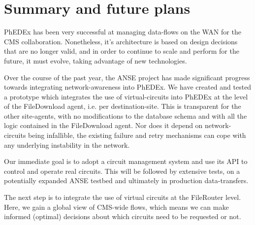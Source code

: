 \section{Summary and future plans}

PhEDEx has been very successful at managing data-flows on the WAN for the CMS collaboration. Nonetheless, it's architecture is based on design decisions that are no longer valid, and in order to continue to scale and perform for the future, it must evolve, taking advantage of new technologies.

Over the course of the past year, the ANSE project has made significant progress
towards integrating network-awareness into PhEDEx. We have
created and tested a prototype which integrates the use of virtual-circuits into
PhEDEx at the level of the FileDownload agent, i.e. per destination-site. This is transparent for the other site-agents, with no modifications to the database schema and with all the logic contained in the FileDownload
agent. Nor does it depend on network-circuits being infallible, the existing failure and retry mechanisms can cope with any underlying instability in the network.

Our immediate goal is to adopt a circuit management system and use its API to
control and operate real circuits. This will be followed by extensive tests, on 
a potentially expanded ANSE testbed and ultimately in production data-transfers.

The next step is to integrate the use
of virtual circuits at the FileRouter level. Here, we gain a global view of 
CMS-wide flows, which means we can make informed (optimal) decisions about which 
circuits need to be requested or not.